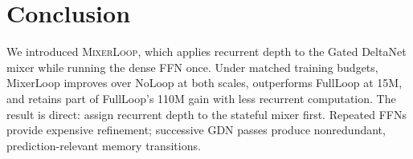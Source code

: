 \documentclass{article}
\newcommand{\method}{\textsc{MixerLoop}}
\begin{document}
\section{Conclusion}

We introduced \method{}, which applies recurrent depth to the Gated DeltaNet
mixer while running the dense FFN once. Under matched training budgets,
MixerLoop improves over NoLoop at both scales, outperforms FullLoop at 15M, and
retains part of FullLoop's 110M gain with less recurrent computation. The result
is direct: assign recurrent depth to the stateful mixer first. Repeated FFNs
provide expensive refinement; successive GDN passes produce nonredundant,
prediction-relevant memory transitions.




\end{document}
